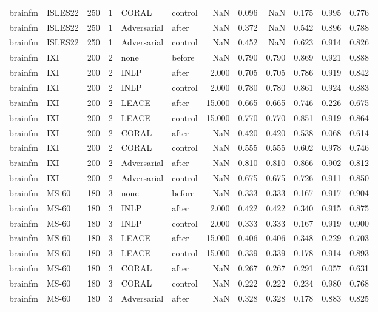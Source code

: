 \begin{tabular}{llrrllrrrrrr}
brainfm & ISLES22 & 250 & 1 & CORAL & control & NaN & 0.096 & NaN & 0.175 & 0.995 & 0.776 \\
brainfm & ISLES22 & 250 & 1 & Adversarial & after & NaN & 0.372 & NaN & 0.542 & 0.896 & 0.788 \\
brainfm & ISLES22 & 250 & 1 & Adversarial & control & NaN & 0.452 & NaN & 0.623 & 0.914 & 0.826 \\
brainfm & IXI & 200 & 2 & none & before & NaN & 0.790 & 0.790 & 0.869 & 0.921 & 0.888 \\
brainfm & IXI & 200 & 2 & INLP & after & 2.000 & 0.705 & 0.705 & 0.786 & 0.919 & 0.842 \\
brainfm & IXI & 200 & 2 & INLP & control & 2.000 & 0.780 & 0.780 & 0.861 & 0.924 & 0.883 \\
brainfm & IXI & 200 & 2 & LEACE & after & 15.000 & 0.665 & 0.665 & 0.746 & 0.226 & 0.675 \\
brainfm & IXI & 200 & 2 & LEACE & control & 15.000 & 0.770 & 0.770 & 0.851 & 0.919 & 0.864 \\
brainfm & IXI & 200 & 2 & CORAL & after & NaN & 0.420 & 0.420 & 0.538 & 0.068 & 0.614 \\
brainfm & IXI & 200 & 2 & CORAL & control & NaN & 0.555 & 0.555 & 0.602 & 0.978 & 0.746 \\
brainfm & IXI & 200 & 2 & Adversarial & after & NaN & 0.810 & 0.810 & 0.866 & 0.902 & 0.812 \\
brainfm & IXI & 200 & 2 & Adversarial & control & NaN & 0.675 & 0.675 & 0.726 & 0.911 & 0.850 \\
brainfm & MS-60 & 180 & 3 & none & before & NaN & 0.333 & 0.333 & 0.167 & 0.917 & 0.904 \\
brainfm & MS-60 & 180 & 3 & INLP & after & 2.000 & 0.422 & 0.422 & 0.340 & 0.915 & 0.875 \\
brainfm & MS-60 & 180 & 3 & INLP & control & 2.000 & 0.333 & 0.333 & 0.167 & 0.919 & 0.900 \\
brainfm & MS-60 & 180 & 3 & LEACE & after & 15.000 & 0.406 & 0.406 & 0.348 & 0.229 & 0.703 \\
brainfm & MS-60 & 180 & 3 & LEACE & control & 15.000 & 0.339 & 0.339 & 0.178 & 0.914 & 0.893 \\
brainfm & MS-60 & 180 & 3 & CORAL & after & NaN & 0.267 & 0.267 & 0.291 & 0.057 & 0.631 \\
brainfm & MS-60 & 180 & 3 & CORAL & control & NaN & 0.222 & 0.222 & 0.234 & 0.980 & 0.768 \\
brainfm & MS-60 & 180 & 3 & Adversarial & after & NaN & 0.328 & 0.328 & 0.178 & 0.883 & 0.825 \\

\end{tabular}
